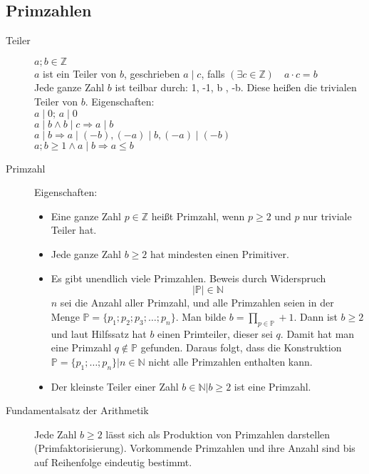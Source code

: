\documentclass[12pt,a4paper]{article}
\begin{document}
\subsection{Primzahlen}
\begin{description}
	\item[Teiler] $a;b \in \mathbb{Z}$\\
		$a$ ist ein Teiler von $b$, geschrieben $a \mid c$, falls $(\exists c \in \mathbb{Z})\quad a \cdot c = b$\\
		Jede ganze Zahl $b$ ist teilbar durch: 1, -1, b , -b. Diese heißen die trivialen Teiler von $b$. Eigenschaften: \\
		$a \mid 0;\, a \mid 0$ \\
		$a \mid b \wedge b \mid c \Rightarrow a \mid b$ \\
		$a \mid b \Rightarrow a \mid (-b), (-a) \mid b, (-a) \mid (-b)$ \\
		$a;b \geq 1 \wedge a \mid b \Rightarrow a \leq b$
	\item[Primzahl] Eigenschaften:
		\begin{itemize}
			\item Eine ganze Zahl $p \in \mathbb{Z}$ heißt Primzahl, wenn $p \geq 2$ und $p$ nur triviale Teiler hat.
			\item Jede ganze Zahl $b \geq 2$ hat mindesten einen Primitiver.
			\item Es gibt unendlich viele Primzahlen. Beweis durch Widerspruch
			      $$|\mathbb{P}| \in \mathbb{N}$$
			      $n$ sei die Anzahl aller Primzahl, und alle Primzahlen seien in der Menge $\mathbb{P} = \lbrace p_1;p_2;p_3;\dots ; p_n \rbrace$. Man bilde $b = \prod\limits_{p \in \mathbb{ P}} + 1$. Dann ist $b \geq 2$ und laut Hilfssatz hat $b$ einen Primteiler, dieser sei $q$. Damit hat man eine Primzahl $q \not \in \mathbb{P}$ gefunden. Daraus folgt, dass die Konstruktion $\mathbb{P} = \lbrace p_1; \dots; p_n \rbrace | n \in \mathbb{N}$ nicht alle Primzahlen enthalten kann.
			\item Der kleinste Teiler einer Zahl $b \in \mathbb{N}|b \geq 2$ ist eine Primzahl.
		\end{itemize}
	\item[Fundamentalsatz der Arithmetik] Jede Zahl $b \geq 2$ lässt sich als Produktion von Primzahlen darstellen (Primfaktorisierung). Vorkommende Primzahlen und ihre Anzahl sind bis auf Reihenfolge eindeutig bestimmt.
\end{description}
\end{document}
